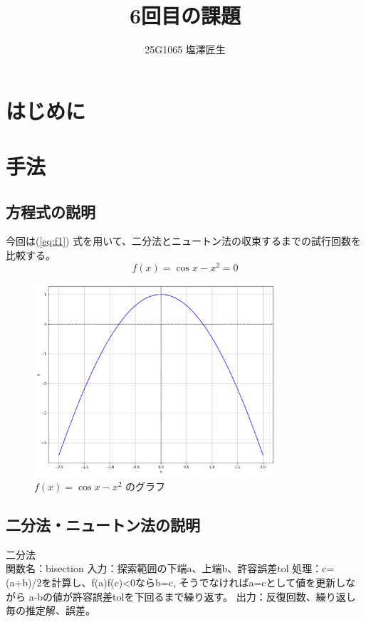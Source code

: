 \documentclass[uplatex]{jsarticle}
\begin{document}
\title{6回目の課題}
\author{25G1065 塩澤匠生}
\maketitle


\section{はじめに}

\section{手法}

\subsection{方程式の説明}

今回は(\ref{eq:f1}) 式を用いて、二分法とニュートン法の収束するまでの試行回数を比較する。
\begin{equation}\label{eq:f1}
    f(x) = \cos x - x^2 = 0
\end{equation}
\begin{figure}[H]
    \centering
    \includegraphics[width=0.8\textwidth]{graph/f1.png}
    \caption{$f(x) = \cos x - x^2$ のグラフ}
    \label{fig:f1graph}
\end{figure}

\subsection{二分法・ニュートン法の説明}

二分法\\
関数名：bisection 入力：探索範囲の下端a、上端b、許容誤差tol
処理：c=(a+b)/2を計算し、f(a)f(c)<0ならb=c, そうでなければa=cとして値を更新しながら
a-bの値が許容誤差tolを下回るまで繰り返す。
出力：反復回数、繰り返し毎の推定解、誤差。\\
\end{document}
